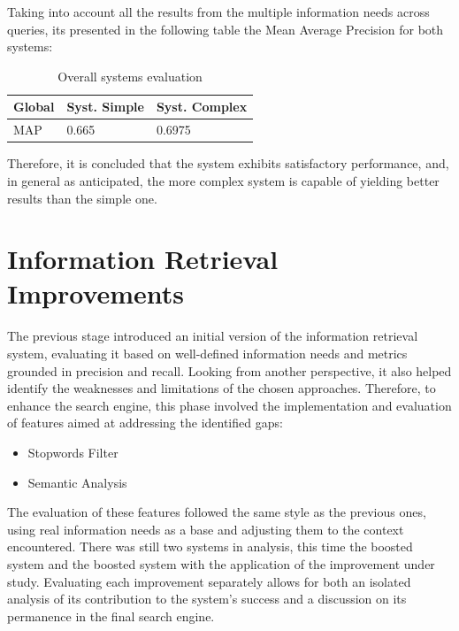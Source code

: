\documentclass[sigconf]{acmart}
\begin{document}
Taking into account all the results from the multiple information needs across queries, its presented in the following table the Mean Average Precision for both systems:

\begin{table}[h]
\caption{Overall systems evaluation}
\label{tab:systems_ev}
\begin{tabular}{lll}
\toprule
Global & Syst. Simple & Syst. Complex\\
\midrule
MAP & 0.665 & 0.6975  \\

\bottomrule
\end{tabular}
\end{table}

Therefore, it is concluded that the system exhibits satisfactory performance, and, in general as anticipated, the more complex system is capable of yielding better results than the simple one.

\renewcommand{\thesubsection}{\arabic{section}.\arabic{subsection}}
\section{Information Retrieval Improvements} \label{sec:improvements}

The previous stage introduced an initial version of the information retrieval system, evaluating it based on well-defined information needs and metrics grounded in precision and recall. Looking from another perspective, it also helped identify the weaknesses and limitations of the chosen approaches. Therefore, to enhance the search engine, this phase involved the implementation and evaluation of features aimed at addressing the identified gaps:

\begin{itemize}
    \item Stopwords Filter
    \item Semantic Analysis
\end{itemize}

The evaluation of these features followed the same style as the previous ones, using real information needs as a base and adjusting them to the context encountered. There was still two systems in analysis, this time the boosted system and the boosted system with the application of the improvement under study. Evaluating each improvement separately allows for both an isolated analysis of its contribution to the system's success and a discussion on its permanence in the final search engine.
\end{document}
